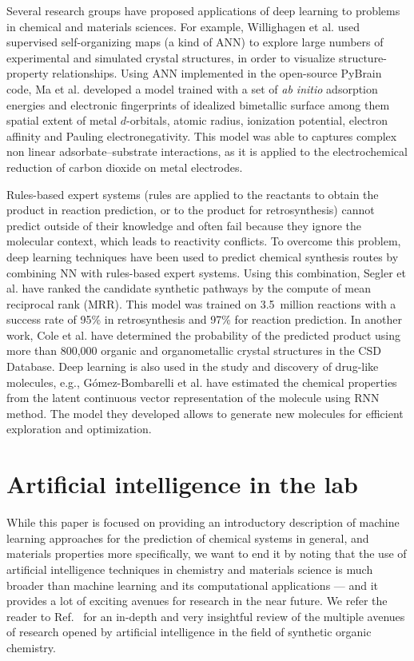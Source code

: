 \documentclass[aip,apm,amsmath,amssymb,reprint]{revtex4-2}
\begin{document}
Several research groups have proposed applications of deep learning to problems in chemical and materials sciences.\cite{Mater2019} For example, Willighagen et al. used supervised self-organizing maps (a kind of ANN) to explore large numbers of experimental and simulated crystal structures, in order to visualize structure-property relationships.\cite{Willighagen2007} Using ANN implemented in the open-source PyBrain code,\cite{pybrain2010jmlr} Ma et al. developed a model trained with a set of \emph{ab initio} adsorption energies and electronic fingerprints of idealized bimetallic surface among them spatial extent of metal $d$-orbitals, atomic radius, ionization potential, electron affinity and Pauling electronegativity.\cite{Ma2015} This model was able to captures complex non linear adsorbate--substrate interactions, as it is applied to the electrochemical reduction of carbon dioxide on metal electrodes.

Rules-based expert systems (rules are applied to the reactants to obtain the product in reaction prediction, or to the product for retrosynthesis) cannot predict outside of their knowledge and often fail because they ignore the molecular context, which leads to reactivity conflicts. To overcome this problem, deep learning techniques have been used to predict chemical synthesis routes by combining NN with rules-based expert systems. Using this combination, Segler et al. have ranked the candidate synthetic pathways by the compute of mean reciprocal rank (MRR).\cite{Segler2017} This model was trained on 3.5~million reactions with a success rate of {95\%} in retrosynthesis and {97\%} for reaction prediction. In another work, Cole et al. have determined the probability of the predicted product using more than 800,000  organic and organometallic crystal structures in the CSD Database.\cite{Cole2016} Deep learning is also used in the study and discovery of drug-like molecules, e.g., G{\'o}mez-Bombarelli et al. have estimated the chemical properties from the latent continuous vector representation of the molecule using RNN method.\cite{GomezBombarelli2018} The model they developed allows to generate new molecules for efficient exploration and optimization.


\section{Artificial intelligence in the lab}

While this paper is focused on providing an introductory description of machine learning approaches for the prediction of chemical systems in general, and materials properties more specifically, we want to end it by noting that the use of artificial intelligence techniques in chemistry and materials science is much broader than machine learning and its computational applications --- and it provides a lot of exciting avenues for research in the near future.\cite{AspuruGuzik2019} We refer the reader to Ref.~ for an in-depth and very insightful review of the multiple avenues of research opened by artificial intelligence in the field of synthetic organic chemistry.
\end{document}
